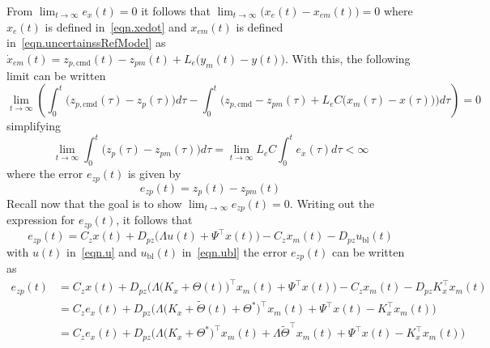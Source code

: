 \begin{proof-dan}
  From $\lim_{t\rightarrow\infty}e_{x}(t)=0$ it follows that $\lim_{t\rightarrow\infty}\bigr(x_{e}(t)-x_{em}(t)\bigr) = 0$ where $x_{e}(t)$ is defined in\ \eqref{eqn.xedot} and $x_{em}(t)$ is defined in\ \eqref{eqn.uncertainssRefModel} as $\dot{x}_{em}(t) = z_{p,\text{cmd}}(t) - z_{pm}(t) + L_{e}\bigr(y_{m}(t)-y(t)\bigr)$.
  With this, the following limit can be written
  \begin{equation*}
    \lim_{t\rightarrow\infty}
    \left(
    \int_{0}^{t} \bigr(z_{p,\text{cmd}}(\tau) - z_{p}(\tau)\bigr) d\tau - \int_{0}^{t} \bigr(z_{p,\text{cmd}} - z_{pm}(\tau) + L_{e}C\bigr(x_{m}(\tau)-x(\tau)\bigr)\bigr) d\tau
    \right) = 0
  \end{equation*}
  simplifying
  \begin{equation}
    \label{eqn.intezp}
    \lim_{t\rightarrow\infty}
    \int_{0}^{t} \bigr(z_{p}(\tau) - z_{pm}(\tau)\bigr) d\tau
    =
    \lim_{t\rightarrow\infty}
    L_{e}C \int_{0}^{t} e_{x}(\tau) d\tau < \infty
  \end{equation}
  where the error $e_{zp}(t)$ is given by
  \begin{equation*}
    e_{zp}(t) = z_{p}(t) - z_{pm}(t)
  \end{equation*}
  Recall now that the goal is to show $\lim_{t\rightarrow\infty}e_{zp}(t)=0$.
  Writing out the expression for $e_{zp}(t)$, it follows that
  \begin{equation*}
    e_{zp}(t) = C_{z}x(t) + D_{pz}\bigr(\Lambda u(t) + \Psi^{\top}x(t)\bigr) - C_{z}x_{m}(t) - D_{pz}u_{\text{bl}}(t)
  \end{equation*}
  with $u(t)$ in\ \eqref{eqn.u} and $u_{\text{bl}}(t)$ in\ \eqref{eqn.ubl} the error $e_{zp}(t)$ can be written as
  \begin{equation}
    \label{eqn.ezp}
    \begin{split}
      e_{zp}(t)
      &=
      C_{z}x(t) + D_{pz}\bigr(\Lambda \bigr(K_{x}+\Theta(t)\bigr)^{\top}x_{m}(t)+\Psi^{\top}x(t)\bigr) - C_{z}x_{m}(t) - D_{pz}K_{x}^{\top}x_{m}(t) \\
      &=
      C_{z}e_{x}(t) + D_{pz}\bigr(\Lambda \bigr(K_{x}+\widetilde{\Theta}(t)+\Theta^{*}\bigr)^{\top}x_{m}(t) + \Psi^{\top}x(t) - K_{x}^{\top}x_{m}(t)\bigr) \\
      &=
      C_{z}e_{x}(t) + D_{pz}\bigr(\Lambda \bigr(K_{x}+\Theta^{*}\bigr)^{\top}x_{m}(t) + \Lambda\widetilde{\Theta}^{\top}x_{m}(t)+\Psi^{\top}x(t) - K_{x}^{\top}x_{m}(t)\bigr) \\
    \end{split}

\end{equation}
\end{proof-dan}
